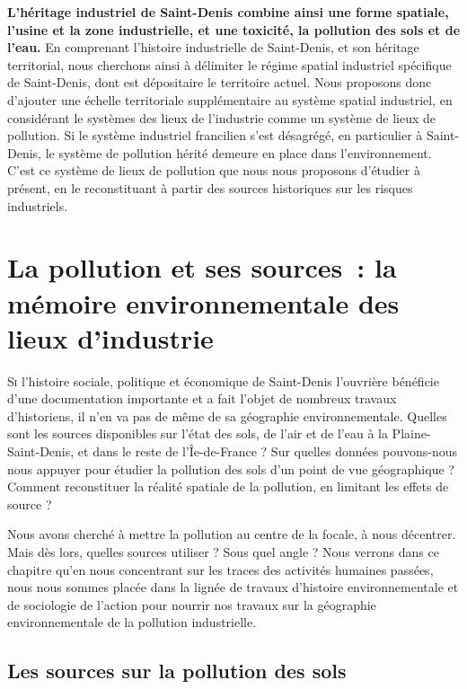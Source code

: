 \documentclass[a4paper,twoside,12pt]{book}
\begin{document}
\textbf{L'héritage industriel de Saint-Denis combine ainsi une forme spatiale, l'usine et la zone industrielle, et une toxicité, la pollution des sols et de l'eau.} En comprenant l'histoire industrielle de Saint-Denis, et son héritage territorial, nous cherchons ainsi à délimiter le régime spatial industriel spécifique de Saint-Denis, dont est dépositaire le territoire actuel. Nous proposons donc d’ajouter une échelle territoriale supplémentaire au système spatial industriel, en considérant le systèmes des lieux de l’industrie comme un système de lieux de pollution. Si le système industriel francilien s’est désagrégé, en particulier à Saint-Denis, le système de pollution hérité demeure en place dans l’environnement. C’est ce système de lieux de pollution que nous nous proposons d’étudier à présent, en le reconstituant à partir des sources historiques sur les risques industriels. 

\chapter{La pollution et ses sources : la mémoire environnementale des lieux d’industrie}

\lettrine{S}{i} l'histoire sociale, politique et économique de Saint-Denis l'ouvrière bénéficie d'une documentation importante et a fait l'objet de nombreux travaux d'historiens, il n'en va pas de même de sa géographie environnementale. Quelles sont les sources disponibles sur l'état des sols, de l'air et de l'eau à la Plaine-Saint-Denis, et dans le reste de l'Îe-de-France ? Sur quelles données pouvons-nous nous appuyer pour étudier la pollution des sols d'un point de vue géographique ? Comment reconstituer la réalité spatiale de la pollution, en limitant les effets de source ?

Nous avons cherché à mettre la pollution au centre de la focale, à nous décentrer. Mais dès lors, quelles sources utiliser ? Sous quel angle ? Nous verrons dans ce chapitre qu'en nous concentrant sur les traces des activités humaines passées, nous nous sommes placée dans la lignée de travaux d'histoire environnementale et de sociologie de l'action pour nourrir nos travaux sur la géographie environnementale de la pollution industrielle.  

\section[Les sources sur la pollution des sols]{Les sources sur la pollution des sols}
\end{document}
